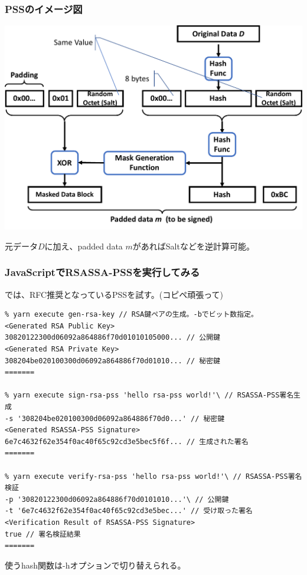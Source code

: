 \documentclass[12pt,dvipdfmx]{beamer}
\begin{document}
\begin{frame}
\frametitle{PSSのイメージ図}
\begin{center}
\includegraphics[width=0.8\linewidth]{Figs/pss.pdf}
\end{center}
元データ$D$に加え、padded data $m$があればSaltなどを逆計算可能。
\end{frame}


\begin{frame}[fragile]
\frametitle{JavaScriptでRSASSA-PSSを実行してみる}
では、RFC推奨となっているPSSを試す。(コピペ頑張って)
\begin{exampleblock}{}
\scriptsize
\begin{verbatim}
% yarn execute gen-rsa-key // RSA鍵ペアの生成。-bでビット数指定。
<Generated RSA Public Key>
30820122300d06092a864886f70d01010105000... // 公開鍵
<Generated RSA Private Key>
308204be020100300d06092a864886f70d01010... // 秘密鍵
=======

% yarn execute sign-rsa-pss 'hello rsa-pss world!'\ // RSASSA-PSS署名生成
-s '308204be020100300d06092a864886f70d0...' // 秘密鍵
<Generated RSASSA-PSS Signature>
6e7c4632f62e354f0ac40f65c92cd3e5bec5f6f... // 生成された署名
=======

% yarn execute verify-rsa-pss 'hello rsa-pss world!'\ // RSASSA-PSS署名検証
-p '30820122300d06092a864886f70d0101010...'\ // 公開鍵
-t '6e7c4632f62e354f0ac40f65c92cd3e5bec...' // 受け取った署名
<Verification Result of RSASSA-PSS Signature>
true // 署名検証結果
=======
\end{verbatim}
\end{exampleblock}
使うhash関数は-hオプションで切り替えられる。

\end{frame}
\end{document}
